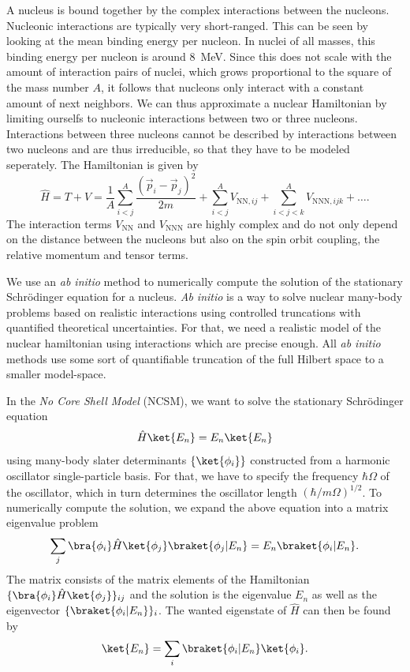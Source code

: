 
A nucleus is bound together by the complex interactions between the nucleons. Nucleonic interactions are typically very short-ranged. This can be seen by looking at the mean binding energy per nucleon. In nuclei of all masses, this binding energy per nucleon is around \SI{8}{\mega\electronvolt}. Since this does not scale with the amount of interaction pairs of nuclei, which grows proportional to the square of the mass number $A$, it follows that nucleons only interact with a constant amount of next neighbors. We can thus approximate a nuclear Hamiltonian by limiting ourselfs to nucleonic interactions between two or three nucleons. Interactions between three nucleons cannot be described by interactions between two nucleons and are thus irreducible, so that they have to be modeled seperately. The Hamiltonian is given by
\begin{equation}
  \hat{H} = T + V = \frac{1}{A}\sum_{i<j}^A\frac{(\vec{p}_i - \vec{p}_j)^2}{2m} + \sum_{i<j}^A V_{\mathrm{NN}, ij} + \sum_{i<j<k}^AV_{\mathrm{NNN}, ijk} + \dots.
\end{equation}
The interaction terms $V_\mathrm{NN}$ and $V_\mathrm{NNN}$ are highly complex and do not only depend on the distance between the nucleons but also on the spin orbit coupling, the relative momentum and tensor terms.

We use an \textit{ab initio} method to numerically compute the solution of the stationary Schrödinger equation for a nucleus. \textit{Ab initio} is a way to solve nuclear many-body problems based on realistic interactions using controlled truncations with quantified theoretical uncertainties. For that, we need a realistic model of the nuclear hamiltonian using interactions which are precise enough. All \textit{ab initio} methods use some sort of quantifiable truncation of the full Hilbert space to a smaller model-space.

In the \textit{No Core Shell Model} (NCSM), we want to solve the stationary Schrödinger equation
\begin{equation}
  \hat{H} \ket{E_n} = E_n \ket{E_n}
\end{equation}
using many-body slater determinants $\{\ket{\phi_i}\}$ constructed from a harmonic oscillator single-particle basis. For that, we have to specify the frequency $\hbar \Omega$ of the oscillator, which in turn determines the oscillator length $(\hbar / m\Omega)^{1/2}$. To numerically compute the solution, we expand the above equation into a matrix eigenvalue problem
\begin{equation}
  \sum_j \bra{\phi_i}\hat{H}\ket{\phi_j}\braket{\phi_j | E_n} = E_n \braket{\phi_i | E_n}.
\end{equation}
The matrix consists of the matrix elements of the Hamiltonian $\{\bra{\phi_i}\hat{H}\ket{\phi_j}\}_{ij}$ and the solution is the eigenvalue $E_n$ as well as the eigenvector $\{\braket{\phi_i|E_n}\}_i$. The wanted eigenstate of $\hat{H}$ can then be found by
\begin{equation}
  \ket{E_n} = \sum_i \braket{\phi_i | E_n} \ket{\phi_i}.
\end{equation}

